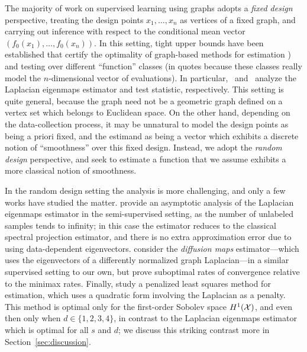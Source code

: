 The majority of work on supervised learning using graphs adopts a \emph{fixed design} perspective, treating the design points $x_1,\ldots,x_n$ as vertices of a fixed graph, and carrying out inference with respect to the conditional mean vector $(f_0(x_1),\ldots,f_0(x_n))$. In this setting, tight upper bounds have been established that certify the optimality of graph-based methods for estimation \citep{wang2016,hutter2016,sadhanala16,sadhanala17,kirichenko2017,kirichenko2018}) and testing \citep{sharpnack2010identifying,sharpnack2013b,sharpnack2013,sharpnack2015} over different ``function'' classes (in quotes because these classes really model the $n$-dimensional vector of evaluations). In particular,~\citet{sadhanala16} and~\citet{sharpnack2015} analyze the Laplacian eigenmaps estimator and test statistic, respectively. This setting is quite general, because the graph need not be a geometric graph defined on a vertex set which belongs to Euclidean space. On the other hand, depending on the data-collection process, it may be unnatural to model the design points as being a priori fixed, and the estimand as being a vector which exhibits a discrete notion of ``smoothness'' over this fixed design. Instead, we adopt the \emph{random design} perspective, and seek to estimate a function that we assume exhibits a more classical notion of smoothness. 

In the random design setting the analysis is more challenging, and only a few works have studied the matter. \cite{zhou2011} provide an asymptotic analysis of the Laplacian eigenmaps estimator in the semi-supervised setting, as the number of unlabeled samples tends to infinity; in this case the estimator reduces to the classical spectral projection estimator, and there is no extra approximation error due to using data-dependent eigenvectors. \cite{lee2016} consider the \emph{diffusion maps} estimator---which uses the eigenvectors of a differently normalized graph Laplacian---in a similar supervised setting to our own, but prove suboptimal rates of convergence relative to the minimax rates. Finally, \citet{trillos2020,green2021} study a penalized least squares method for estimation, which uses a quadratic form involving the Laplacian as a penalty. This method is optimal only for the first-order Sobolev space $H^1(\mathcal{X})$, and even then only when $d \in \{1,2,3,4\}$, in contrast to the Laplacian eigenmaps estimator which is optimal for all $s$ and $d$; we discuss this striking contrast more in Section~\ref{sec:discussion}.

